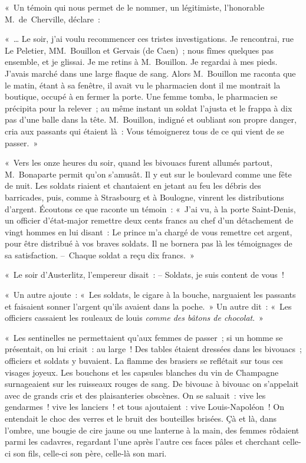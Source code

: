 \documentclass[french,twoside]{book} %
\newenvironment{quoteblock}%
  {\begin{quoting}}
  {\end{quoting}}
\newenvironment{quotebar}{%
    \def\FrameCommand{{\color{rubric!10!}\vrule width 0.5em} \hspace{0.9em}}%
    \def\OuterFrameSep{0pt} %
    \MakeFramed {\advance\hsize-\width \FrameRestore}
  }%
  {%
    \endMakeFramed
  }
\renewenvironment{quoteblock}%
  {%
    \savenotes
    \setstretch{0.9}
    \begin{quotebar}
    \smallskip
  }
  {%
    \smallskip
    \end{quotebar}
    \spewnotes
  }
\begin{document}
\noindent « Un témoin qui nous permet de le nommer, un légitimiste, l’honorable M. de Cherville, déclare :\par

\begin{quoteblock}
 \noindent « … Le soir, j’ai voulu recommencer ces tristes investigations. Je rencontrai, rue Le Peletier, MM. Bouillon et Gervais (de Caen) ; nous fîmes quelques pas ensemble, et je glissai. Je me retins à M. Bouillon. Je regardai à mes pieds. J’avais marché dans une large flaque de sang. Alors M. Bouillon me raconta que le matin, étant à sa fenêtre, il avait vu le pharmacien dont il me montrait la boutique, occupé à en fermer la porte. Une femme tomba, le pharmacien se précipita pour la relever ; au même instant un soldat l’ajusta et le frappa à dix pas d’une balle dans la tête. M. Bouillon, indigné et oubliant son propre danger, cria aux passants qui étaient là : Vous témoignerez tous de ce qui vient de se passer. »\par
 « Vers les onze heures du soir, quand les bivouacs furent allumés partout, M. Bonaparte permit qu’on s’amusât. Il y eut sur le boulevard comme une fête de nuit. Les soldats riaient et chantaient en jetant au feu les débris des barricades, puis, comme à Strasbourg et à Boulogne, vinrent les distributions d’argent. Écoutons ce que raconte un témoin : « J’ai vu, à la porte Saint-Denis, un officier d’état-major remettre deux cents francs au chef d’un détachement de vingt hommes en lui disant : Le prince m’a chargé de vous remettre cet argent, pour être distribué à vos braves soldats. Il ne bornera pas là les témoignages de sa satisfaction. – Chaque soldat a reçu dix francs. »
 \end{quoteblock}

\noindent « Le soir d’Austerlitz, l’empereur disait : – Soldats, je suis content de vous !\par
« Un autre ajoute : « Les soldats, le cigare à la bouche, narguaient les passants et faisaient sonner l’argent qu’ils avaient dans la poche. » Un autre dit : « Les officiers cassaient les rouleaux de louis \emph{comme des bâtons de chocolat}. »\par
« Les sentinelles ne permettaient qu’aux femmes de passer ; si un homme se présentait, on lui criait : au large ! Des tables étaient dressées dans les bivouacs ; officiers et soldats y buvaient. La flamme des brasiers se reflétait sur tous ces visages joyeux. Les bouchons et les capsules blanches du vin de Champagne surnageaient sur les ruisseaux rouges de sang. De bivouac à bivouac on s’appelait avec de grands cris et des plaisanteries obscènes. On se saluait : vive les gendarmes ! vive les lanciers ! et tous ajoutaient : vive Louis-Napoléon ! On entendait le choc des verres et le bruit des bouteilles brisées. Çà et là, dans l’ombre, une bougie de cire jaune ou une lanterne à la main, des femmes rôdaient parmi les cadavres, regardant l’une après l’autre ces faces pâles et cherchant celle-ci son fils, celle-ci son père, celle-là son mari.
\end{document}
